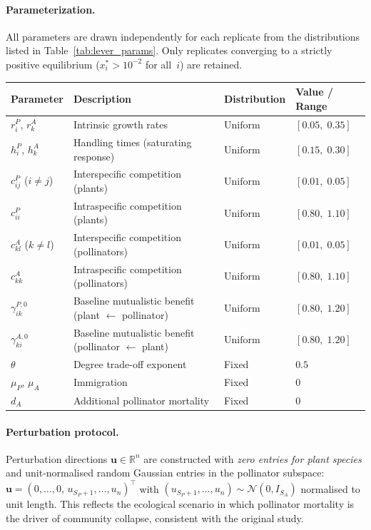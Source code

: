\documentclass[pdflatex,sn-mathphys-num]{sn-jnl}%
\begin{document}
\paragraph{Parameterization.} All parameters are drawn independently for each replicate from the distributions listed in Table~\ref{tab:lever_params}. Only replicates converging to a strictly positive equilibrium ($x^*_i > 10^{-2}$ for all~$i$) are retained.
\begin{center}
\begin{tabular}{llll}
\hline
Parameter & Description & Distribution & Value / Range \\
\hline
$r^P_i$, $r^A_k$  & Intrinsic growth rates   & $\mathrm{Uniform}$ & $[0.05,\;0.35]$ \\
$h^P_i$, $h^A_k$  & Handling times (saturating response) & $\mathrm{Uniform}$ & $[0.15,\;0.30]$ \\
$c^P_{ij}$ ($i\neq j$) & Interspecific competition (plants) & $\mathrm{Uniform}$ & $[0.01,\;0.05]$ \\
$c^P_{ii}$    & Intraspecific competition (plants) & $\mathrm{Uniform}$ & $[0.80,\;1.10]$ \\
$c^A_{kl}$ ($k\neq l$) & Interspecific competition (pollinators) & $\mathrm{Uniform}$ & $[0.01,\;0.05]$ \\
$c^A_{kk}$    & Intraspecific competition (pollinators) & $\mathrm{Uniform}$ & $[0.80,\;1.10]$ \\
$\gamma^{P,0}_{ik}$  & Baseline mutualistic benefit (plant $\leftarrow$ pollinator) & $\mathrm{Uniform}$ & $[0.80,\;1.20]$ \\
$\gamma^{A,0}_{ki}$  & Baseline mutualistic benefit (pollinator $\leftarrow$ plant) & $\mathrm{Uniform}$ & $[0.80,\;1.20]$ \\
$\theta$     & Degree trade-off exponent   & Fixed    & $0.5$ \\
$\mu_P$, $\mu_A$   & Immigration      & Fixed    & $0$ \\
$d_A$     & Additional pollinator mortality & Fixed    & $0$ \\
\hline
\end{tabular}
\label{tab:lever_params}
\end{center}

\paragraph{Perturbation protocol.} Perturbation directions $\mathbf{u} \in \mathbb{R}^n$ are constructed with \emph{zero entries for plant species} and unit-normalised random Gaussian entries in the pollinator subspace: $\mathbf{u} = (0,\dots,0,\, u_{S_P+1},\dots,u_n)^\top$ with $(u_{S_P+1},\dots,u_n) \sim \mathcal{N}(0,I_{S_A})$ normalised to unit length. This reflects the ecological scenario in which pollinator mortality is the driver of community collapse, consistent with the original study.
\end{document}
